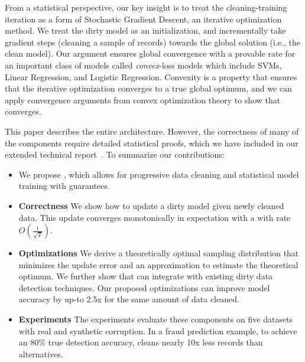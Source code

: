 From a statistical perspective, our key insight is to treat the cleaning-training iteration as a form of Stochastic Gradient Descent, an iterative optimization method.
We treat the dirty model as an initialization, and incrementally take gradient steps (cleaning a sample of records) towards the global solution (i.e., the clean model).
Our argument ensures global convergence with a provable rate for an important class of models called \emph{convex}-loss models which include SVMs, Linear Regression, and Logistic Regression.
Convexity is a property that ensures that the iterative optimization converges to a true global optimum, and we can apply convergence arguments from convex optimization theory to show that \sys converges.

This paper describes the entire \sys architecture. However, the correctness of many of the components require detailed statistical proofs, which we have included in our extended technical report~\cite{activecleanarxiv}. To summarize our contributions:
\begin{itemize}[noitemsep]
\item We propose \sys, which allows for progressive data cleaning and statistical model training with guarantees.
\item \textbf{Correctness} We show how to update a dirty model given newly cleaned data. This update converges monotonically in expectation with a with rate $O(\frac{1}{\sqrt{T}})$.
\item \textbf{Optimizations} We derive a theoretically optimal sampling distribution that minimizes the update error and an approximation to estimate the theoretical optimum. We further show that \sys can integrate with existing dirty data detection techniques. Our proposed optimizations can improve model accuracy by up-to 2.5x for the same amount of data cleaned.
\item \textbf{Experiments} The experiments evaluate these components on five datasets with real and synthetic corruption. In a fraud prediction example, to achieve an 80\% true detection accuracy, \sys cleans nearly 10x less records than alternatives.
\end{itemize}






